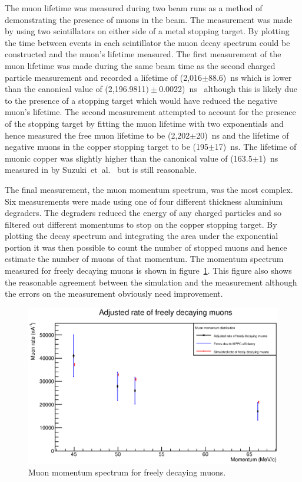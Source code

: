The muon lifetime was measured during two beam runs as a method of demonstrating the presence of muons in the beam. The measurement was made by using two scintillators on either side of a metal stopping target. By plotting the time between events in each scintillator the muon decay spectrum could be constructed and the muon's lifetime measured. The first measurement of the muon lifetime was made during the same beam time as the second charged particle measurement and recorded a lifetime of (2,016\(\pm\)88.6)~ns which is lower than the canonical value of (2,196.9811\()\pm\)0.0022)~ns~\cite{pdg} although this is likely due to the presence of a stopping target which would have reduced the negative muon's lifetime. The second measurement attempted to account for the presence of the stopping target by fitting the muon lifetime with two exponentials and hence measured the free muon lifetime to be (2,202\(\pm\)20)~ns and the lifetime of negative muons in the copper stopping target to be (195\(\pm\)17)~ns. The lifetime of muonic copper was slightly higher than the canonical value of (163.5\(\pm\)1)~ns measured in by Suzuki~et~al.~\cite{suzuki_mu_capture_rates} but is still reasonable.

The final measurement, the muon momentum spectrum, was the most complex. Six measurements were made using one of four different thickness aluminium degraders. The degraders reduced the energy of any charged particles and so filtered out different momentums to stop on the copper stopping target. By plotting the decay spectrum and integrating the area under the exponential portion it was then possible to count the number of stopped muons and hence estimate the number of muons of that momentum. The momentum spectrum measured for freely decaying muons is shown in figure~\ref{fig:exec_summary_muon_momentum_spectrum}. This figure also shows the reasonable agreement between the simulation and the measurement although the errors on the measurement obviously need improvement. 

\begin{figure}[htpb]
  \centering
    \includegraphics[width=.9\textwidth]{../3_measurements/images/plot_generating_scripts/adjusted_muon_rates.eps}
  \caption{Muon momentum spectrum for freely decaying muons.}
  \label{fig:exec_summary_muon_momentum_spectrum}
\end{figure}

